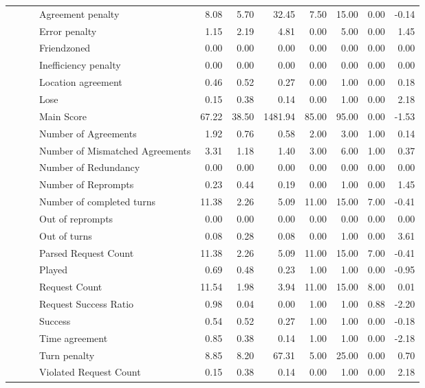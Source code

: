 \begin{tabular}{llllrrrrrrr}
 &  &  & Agreement penalty & 8.08 & 5.70 & 32.45 & 7.50 & 15.00 & 0.00 & -0.14 \\
 &  &  & Error penalty & 1.15 & 2.19 & 4.81 & 0.00 & 5.00 & 0.00 & 1.45 \\
 &  &  & Friendzoned & 0.00 & 0.00 & 0.00 & 0.00 & 0.00 & 0.00 & 0.00 \\
 &  &  & Inefficiency penalty & 0.00 & 0.00 & 0.00 & 0.00 & 0.00 & 0.00 & 0.00 \\
 &  &  & Location agreement & 0.46 & 0.52 & 0.27 & 0.00 & 1.00 & 0.00 & 0.18 \\
 &  &  & Lose & 0.15 & 0.38 & 0.14 & 0.00 & 1.00 & 0.00 & 2.18 \\
 &  &  & Main Score & 67.22 & 38.50 & 1481.94 & 85.00 & 95.00 & 0.00 & -1.53 \\
 &  &  & Number of Agreements & 1.92 & 0.76 & 0.58 & 2.00 & 3.00 & 1.00 & 0.14 \\
 &  &  & Number of Mismatched Agreements & 3.31 & 1.18 & 1.40 & 3.00 & 6.00 & 1.00 & 0.37 \\
 &  &  & Number of Redundancy & 0.00 & 0.00 & 0.00 & 0.00 & 0.00 & 0.00 & 0.00 \\
 &  &  & Number of Reprompts & 0.23 & 0.44 & 0.19 & 0.00 & 1.00 & 0.00 & 1.45 \\
 &  &  & Number of completed turns & 11.38 & 2.26 & 5.09 & 11.00 & 15.00 & 7.00 & -0.41 \\
 &  &  & Out of reprompts & 0.00 & 0.00 & 0.00 & 0.00 & 0.00 & 0.00 & 0.00 \\
 &  &  & Out of turns & 0.08 & 0.28 & 0.08 & 0.00 & 1.00 & 0.00 & 3.61 \\
 &  &  & Parsed Request Count & 11.38 & 2.26 & 5.09 & 11.00 & 15.00 & 7.00 & -0.41 \\
 &  &  & Played & 0.69 & 0.48 & 0.23 & 1.00 & 1.00 & 0.00 & -0.95 \\
 &  &  & Request Count & 11.54 & 1.98 & 3.94 & 11.00 & 15.00 & 8.00 & 0.01 \\
 &  &  & Request Success Ratio & 0.98 & 0.04 & 0.00 & 1.00 & 1.00 & 0.88 & -2.20 \\
 &  &  & Success & 0.54 & 0.52 & 0.27 & 1.00 & 1.00 & 0.00 & -0.18 \\
 &  &  & Time agreement & 0.85 & 0.38 & 0.14 & 1.00 & 1.00 & 0.00 & -2.18 \\
 &  &  & Turn penalty & 8.85 & 8.20 & 67.31 & 5.00 & 25.00 & 0.00 & 0.70 \\
 &  &  & Violated Request Count & 0.15 & 0.38 & 0.14 & 0.00 & 1.00 & 0.00 & 2.18 \\

\end{tabular}
